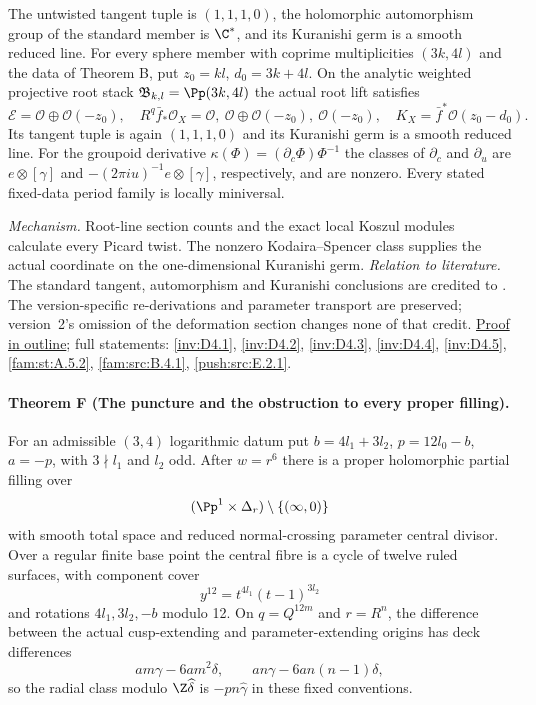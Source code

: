 The untwisted tangent tuple is $(1,1,1,0)$, the holomorphic
automorphism group of the standard member is $\C^*$, and its
Kuranishi germ is a smooth reduced line.  For every sphere member
with coprime multiplicities $(3k,4l)$ and the data of Theorem B,
put $z_0=kl$, $d_0=3k+4l$.  On the analytic weighted projective root stack
$\mathfrak B_{k,l}=\Pp(3k,4l)$ the actual root lift satisfies
\[
 \mathcal E=\mathcal O\oplus\mathcal O(-z_0),\quad
 R^q\bar f_*\mathcal O_X=
 \mathcal O,\ \mathcal O\oplus\mathcal O(-z_0),\ \mathcal O(-z_0),
 \quad K_X=\bar f^*\mathcal O(z_0-d_0).
\]
Its tangent tuple is again $(1,1,1,0)$ and its Kuranishi germ is
a smooth reduced line.  For the groupoid derivative
$\kappa(\Phi)=(\partial_c\Phi)\Phi^{-1}$ the classes of
$\partial_c$ and $\partial_u$ are
$e\otimes[\gamma]$ and $-(2\pi i u)^{-1}e\otimes[\gamma]$,
respectively, and are nonzero.  Every stated fixed-data period
family is locally miniversal.

\textit{Mechanism.} Root-line section counts and the exact local
Koszul modules calculate every Picard twist.  The nonzero
Kodaira--Spencer class supplies the actual coordinate on the
one-dimensional Kuranishi germ.
\textit{Relation to literature.} The standard tangent, automorphism
and Kuranishi conclusions are credited to
\cite[Theorems~1.3--1.4, p.~3; Theorem~6.12, pp.~81--82;
Theorem~6.16, p.~85]{DuEtAl2026v1}.  The version-specific
re-derivations and parameter transport are preserved; version~2's
omission of the deformation section changes none of that credit.
\hyperlink{outline-I-E}{Proof in outline}; full statements:
\ref{inv:D4.1}, \ref{inv:D4.2}, \ref{inv:D4.3},
\ref{inv:D4.4}, \ref{inv:D4.5}, \ref{fam:st:A.5.2},
\ref{fam:src:B.4.1}, \ref{push:src:E.2.1}.

\hypertarget{main-I-F}{}
\paragraph{Theorem F (The puncture and the obstruction to every proper filling).}
\label{series:I:F}
For an admissible $(3,4)$ logarithmic datum put
$b=4l_1+3l_2$, $p=12l_0-b$, $a=-p$, with
$3\nmid l_1$ and $l_2$ odd.  After $w=r^6$ there is a proper
holomorphic partial filling over
\[
 (\Pp^1\times\Delta_r)\setminus\{(\infty,0)\}
\]
with smooth total space and reduced normal-crossing parameter
central divisor.  Over a regular finite base point the central
fibre is a cycle of twelve ruled surfaces, with component cover
\[
 y^{12}=t^{4l_1}(t-1)^{3l_2}
\]
and rotations $4l_1,3l_2,-b$ modulo 12.
On $q=Q^{12m}$ and $r=R^n$, the difference between the actual
cusp-extending and parameter-extending origins has deck
differences
\[
 am\gamma-6am^2\delta,\qquad
 an\gamma-6an(n-1)\delta,
\]
so the radial class modulo $\Z\widehat\delta$ is
$-pn\widehat\gamma$ in these fixed conventions.

